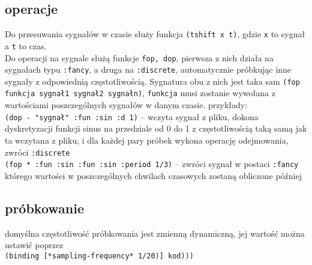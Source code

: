 \documentclass[12pt]{article}
\newcommand{\cljt}[1]{\texttt{#1}}
\begin{document}
\subsection{operacje}
Do przesuwania sygnałów w czasie służy funkcja \cljt{(tshift x t)}, gdzie \cljt{x} to sygnał a \cljt{t} to czas. \\
Do operacji na sygnale służą funkcje \cljt{fop, dop}, pierwsza z nich działa na sygnałach typu \cljt{:fancy}, a druga na \cljt{:discrete}, automatycznie próbkując inne sygnały z odpowiednią częstotliwością. Sygnatura obu z nich jest taka sam \cljt{(fop funkcja sygnał1 sygnał2 sygnałn)}, \cljt{funkcja} musi zostanie wywołana z wartościami poszczególnych sygnałów w danym czasie. przykłady: \\
\cljt{(dop - "sygnał" {:fun :sin :d 1})} -- wczyta sygnał z pliku, dokona dyskretyzacji funkcji sinus na przedziale od 0 do 1 z częstotliwością taką samą jak ta wczytana z pliku, i dla każdej pary próbek wykona operację odejmowania, zwróci \cljt{:discrete} \\
\cljt{(fop * {:fun :sin} {:fun :sin :period 1/3})} -- zwróci sygnał w postaci \cljt{:fancy} którego wartości w poszczególnych chwilach czasowych zostaną obliczone później
\subsection{próbkowanie}
domyślna częstotliwość próbkowania jest zmienną dynamiczną, jej wartość można ustawić poprzez \\
\cljt{(binding [*sampling-frequency* 1/20)] kod)))}
\end{document}
